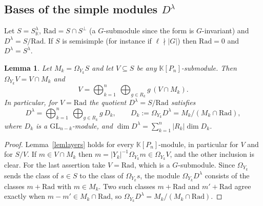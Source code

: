 \documentclass[11pt, letterpaper]{amsart}
\newtheorem{lemma}{Lemma}
\theoremstyle{definition}
\theoremstyle{remark}
\newcommand{\KK}{\mathbb{K}}
\newcommand{\GL}{\mathrm{GL}}
\begin{document}
\subsection{Bases of the simple modules \texorpdfstring{$D^\lambda$}{D(lambda)}}\label{subD}

Let $S=S^\lambda_\KK$, $\mathrm{Rad}=S\cap S^\perp$ (a $G$-submodule since the form is $G$-invariant) and $D^\lambda=S/\mathrm{Rad}$. If $S$ is semisimple (for instance if $\ell\nmid|G|$) then $\mathrm{Rad}=0$ and $D^\lambda=S^\lambda$.

\begin{lemma}\label{lemrad}
Let $M_k=\Omega_{Y_k}S$ and let $V\subseteq S$ be any $\KK[P_n]$-submodule. Then $\Omega_{Y_k}V=V\cap M_k$ and
\[
V=\bigoplus_{k=1}^n\ \bigoplus_{g\in R_k}g\,(V\cap M_k).
\]
In particular, for $V=\mathrm{Rad}$ the quotient $D^\lambda=S/\mathrm{Rad}$ satisfies
\[
D^\lambda=\bigoplus_{k=1}^n\ \bigoplus_{g\in R_k}g\,D_k,\qquad D_k:=\Omega_{Y_k}D^\lambda=M_k/(M_k\cap\mathrm{Rad}),
\]
where $D_k$ is a $\GL_{n-k}$-module, and $\dim D^\lambda=\sum_{k=1}^n|R_k|\dim D_k$.
\end{lemma}
\begin{proof}
Lemma~\ref{lemlayers} holds for every $\KK[P_n]$-module, in particular for $V$ and for $S/V$. If $m\in V\cap M_k$ then $m=|Y_k|^{-1}\Omega_{Y_k}m\in\Omega_{Y_k}V$, and the other inclusion is clear. For the last assertion take $V=\mathrm{Rad}$, which is a $G$-submodule. Since $\Omega_{Y_k}$ sends the class of $s\in S$ to the class of $\Omega_{Y_k}s$, the module $\Omega_{Y_k}D^\lambda$ consists of the classes $m+\mathrm{Rad}$ with $m\in M_k$. Two such classes $m+\mathrm{Rad}$ and $m'+\mathrm{Rad}$ agree exactly when $m-m'\in M_k\cap\mathrm{Rad}$, so $\Omega_{Y_k}D^\lambda=M_k/(M_k\cap\mathrm{Rad})$.
\end{proof}
\end{document}
